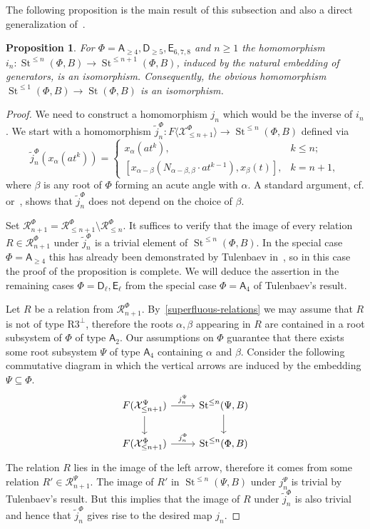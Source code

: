 \documentclass[oneside, 8pt]{amsart}
\newtheorem{prop}[lemma]{Proposition}
\theoremstyle{remark}
\theoremstyle{definition}
\numberwithin{lemma}{section}
\numberwithin{prop}{section}
\numberwithin{corollary}{section}
\numberwithin{externaltheorem}{section}
\DeclareMathOperator{\St}{St}
\newcommand{\rA}{\mathsf{A}}
\newcommand{\rD}{\mathsf{D}}
\newcommand{\rE}{\mathsf{E}}
\numberwithin{equation}{section}
\begin{document}
The following proposition is the main result of this subsection and also a direct generalization of~\cite[Lemma~3.3]{Tu83}.
\begin{prop} \label{lemma33} For $\Phi=\rA_{\geq 4}, \rD_{\geq 5}, \rE_{6,7,8}$ and $n \geq 1$ the homomorphism $i_n\colon \St^{\leq n}(\Phi, B) \to \St^{\leq n+1}(\Phi, B)$, induced by the natural embedding of generators, is an isomorphism. Consequently, the obvious homomorphism $\St^{\leq 1}(\Phi, B) \to \St(\Phi, B)$ is an isomorphism. \end{prop}
\begin{proof}
 We need to construct a homomorphism $j_n$ which would be the inverse of $i_n$. 
 We start with a homomorphism $\widetilde{j}_n^\Phi \colon F\langle \mathcal{X}^\Phi_{\leq n+1} \rangle \to \St^{\leq n}(\Phi, B)$ defined via
 \[ \widetilde{j}^{\Phi}_n(x_\alpha(at^k)) = \begin{cases} x_\alpha(at^k), & k\leq n; \\
      [x_{\alpha - \beta} (N_{\alpha-\beta, \beta} \cdot at^{k-1}), x_{\beta}(t)], & k = n+1, \end{cases} \]
 where $\beta$ is any root of $\Phi$ forming an acute angle with $\alpha$.
 A standard argument, cf. \cite[Proposition~1.1]{Re75} or~\cite[Proposition~3.2.2]{RS76}, shows that $\widetilde{j}^\Phi_n$ does not depend on the choice of $\beta$.
  
 Set $\mathcal{R}^\Phi_{n+1} = \mathcal{R}^\Phi_{\leq n+1} \setminus \mathcal{R}^\Phi_{\leq n}$. It suffices to verify that the image of every relation $R \in \mathcal{R}^\Phi_{n+1}$ under $\widetilde{j}^\Phi_n$ is a trivial element of $\St^{\leq n}(\Phi, B)$. In the special case $\Phi=\rA_{\geq 4}$ this has already been demonstrated by Tulenbaev in~\cite[Lemma~3.3]{Tu83}, so in this case the proof of the proposition is complete. We will deduce the assertion in the remaining cases $\Phi=\rD_\ell,\rE_\ell$ from the special case $\Phi=\rA_4$ of Tulenbaev's result.
 
 Let $R$ be a relation from $\mathcal{R}^\Phi_{n+1}$. By~\cref{superfluous-relations} we may assume that $R$ is not of type $\text{R3}^\bot$, therefore the roots $\alpha, \beta$ appearing in $R$ are contained in a root subsystem of $\Phi$ of type $\rA_2$. Our assumptions on $\Phi$ guarantee that there exists some root subsystem $\Psi$ of type $\rA_4$ containing $\alpha$ and $\beta$. Consider the following commutative diagram in which the vertical arrows are induced by the embedding $\Psi\subseteq\Phi$. 
 \[\begin{tikzcd} F(\mathcal{X}_{\leq n+1}^\Psi) \arrow{r}{j_n^\Psi} \arrow{d} & \St^{\leq n}(\Psi, B) \arrow{d} \\ F(\mathcal{X}_{\leq n+1}^\Phi) \arrow{r}{j_n^\Phi} & \St^{\leq n}(\Phi, B) \end{tikzcd} \]  
The relation $R$ lies in the image of the left arrow, therefore it comes from some relation $R' \in \mathcal{R}^\Psi_{n+1}$. The image of $R'$ in $\St^{\leq n}(\Psi, B)$ under $j_n^\Psi$ is trivial by Tulenbaev's result. But this implies that the image of $R$ under $\widetilde{j}_n^\Phi$ is also trivial and hence that $\widetilde{j}_n^\Phi$ gives rise to the desired map $j_n$.
\end{proof}
\end{document}
